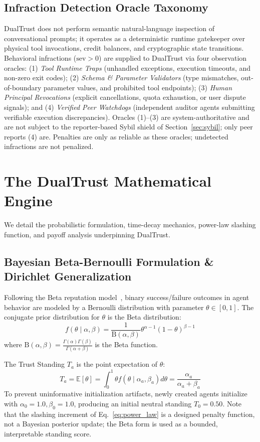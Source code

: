 \documentclass[manuscript, screen, review]{jair}
\begin{document}
\subsection{Infraction Detection Oracle Taxonomy}
DualTrust does not perform semantic natural-language inspection of conversational prompts; it operates as a deterministic runtime gatekeeper over physical tool invocations, credit balances, and cryptographic state transitions. Behavioral infractions ($\text{sev} > 0$) are supplied to DualTrust via four observation oracles: (1) \emph{Tool Runtime Traps} (unhandled exceptions, execution timeouts, and non-zero exit codes); (2) \emph{Schema \& Parameter Validators} (type mismatches, out-of-boundary parameter values, and prohibited tool endpoints); (3) \emph{Human Principal Revocations} (explicit cancellations, quota exhaustion, or user dispute signals); and (4) \emph{Verified Peer Watchdogs} (independent auditor agents submitting verifiable execution discrepancies). Oracles (1)--(3) are system-authoritative and are not subject to the reporter-based Sybil shield of Section~\ref{sec:sybil}; only peer reports (4) are. Penalties are only as reliable as these oracles; undetected infractions are not penalized.

\section{The DualTrust Mathematical Engine}
\label{sec:math_engine}

We detail the probabilistic formulation, time-decay mechanics, power-law slashing function, and payoff analysis underpinning DualTrust.

\subsection{Bayesian Beta-Bernoulli Formulation \& Dirichlet Generalization}
Following the Beta reputation model~\cite{josang2002beta}, binary success/failure outcomes in agent behavior are modeled by a Bernoulli distribution with parameter $\theta \in [0, 1]$. The conjugate prior distribution for $\theta$ is the Beta distribution:
\begin{equation}
f(\theta \mid \alpha, \beta) = \frac{1}{\text{B}(\alpha, \beta)} \theta^{\alpha - 1} (1 - \theta)^{\beta - 1}
\end{equation}
where $\text{B}(\alpha, \beta) = \frac{\Gamma(\alpha)\Gamma(\beta)}{\Gamma(\alpha + \beta)}$ is the Beta function.

The Trust Standing $T_a$ is the point expectation of $\theta$:
\begin{equation}
T_a = \mathbb{E}[\theta] = \int_{0}^{1} \theta f(\theta \mid \alpha_a, \beta_a) d\theta = \frac{\alpha_a}{\alpha_a + \beta_a}
\label{eq:beta_expectation}
\end{equation}
To prevent uninformative initialization artifacts, newly created agents initialize with $\alpha_0 = 1.0, \beta_0 = 1.0$, producing an initial neutral standing $T_0 = 0.50$. Note that the slashing increment of Eq.~\eqref{eq:power_law} is a designed penalty function, not a Bayesian posterior update; the Beta form is used as a bounded, interpretable standing score.
\end{document}

